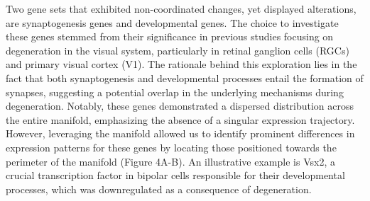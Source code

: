 \documentclass[11pt, a4paper]{article}
\begin{document}


Two gene sets that exhibited non-coordinated changes, yet displayed alterations, are synaptogenesis genes and developmental genes. The choice to investigate these genes stemmed from their significance in previous studies focusing on degeneration in the visual system, particularly in retinal ganglion cells (RGCs) and primary visual cortex (V1). The rationale behind this exploration lies in the fact that both synaptogenesis and developmental processes entail the formation of synapses, suggesting a potential overlap in the underlying mechanisms during degeneration. Notably, these genes demonstrated a dispersed distribution across the entire manifold, emphasizing the absence of a singular expression trajectory. However, leveraging the manifold allowed us to identify prominent differences in expression patterns for these genes by locating those positioned towards the perimeter of the manifold (Figure 4A-B). An illustrative example is Vsx2, a crucial transcription factor in bipolar cells responsible for their developmental processes, which was downregulated as a consequence of degeneration.
\end{document}
